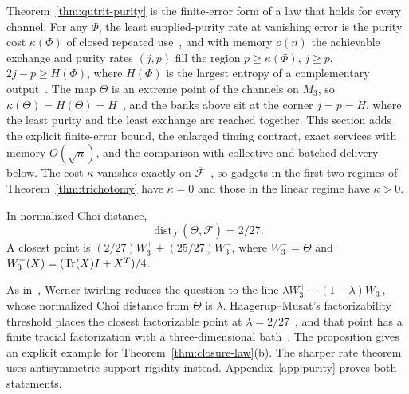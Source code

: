 Theorem~\ref{thm:qutrit-purity} is the finite-error form of a law that
holds for every channel. For any $\Phi$, the least supplied-purity rate at
vanishing error is the purity cost $\kappa(\Phi)$ of closed repeated
use~\cite[Definition~1.3]{DouglasClosedMemory}, and with memory $o(n)$
the achievable exchange and purity rates $(j,p)$ fill the region
$p\geq\kappa(\Phi)$, $j\geq p$, $2j-p\geq H(\Phi)$, where $H(\Phi)$ is the
largest entropy of a complementary output~\cite[Theorems~3.2 and~3.4]{DouglasMghirbiB}.
The map $\Theta$ is an extreme point of the channels on $M_3$, so
$\kappa(\Theta)=H(\Theta)=H$~\cite[Proposition~F.1(c)]{DouglasMghirbiB},
and the banks above sit at the corner $j=p=H$, where the least purity
and the least exchange are reached together. This section adds the
explicit finite-error bound, the enlarged timing contract, exact services
with memory $O(\sqrt n)$, and the comparison with collective and batched
delivery below. The cost $\kappa$ vanishes exactly on
$\overline{\mathcal F}$~\cite[Theorem~3.2]{DouglasMghirbiB}, so gadgets in
the first two regimes of Theorem~\ref{thm:trichotomy} have $\kappa=0$ and
those in the linear regime have $\kappa>0$.

\begin{proposition}\label{prop:qutrit-gap}
In normalized Choi distance,
\[
 \operatorname{dist}_J(\Theta,\overline{\mathcal F})=2/27.
\]
A closest point is $(2/27)W_3^++(25/27)W_3^-$, where $W_3^-=\Theta$ and
$W_3^+(X)=(\operatorname{Tr}(X)I+X^T)/4$.
\end{proposition}

As in~\cite[Section~4 and the proof of Theorem~5.6(2)]{HaagerupMusat2015}, Werner twirling reduces the question to the line
$\lambda W_3^++(1-\lambda)W_3^-$, whose normalized Choi distance from
$\Theta$ is $\lambda$. Haagerup--Musat's factorizability threshold
places the closest factorizable point at
$\lambda=2/27$~\cite[Theorem~5.6 and Corollary~5.7]{HaagerupMusat2015},
and that point has a finite tracial factorization with a three-dimensional
bath~\cite[Theorem~5.6(1)]{HaagerupMusat2015}. The proposition gives an explicit example for Theorem~\ref{thm:closure-law}(b).
The sharper rate theorem uses antisymmetric-support rigidity instead.
Appendix~\ref{app:purity} proves both statements.

